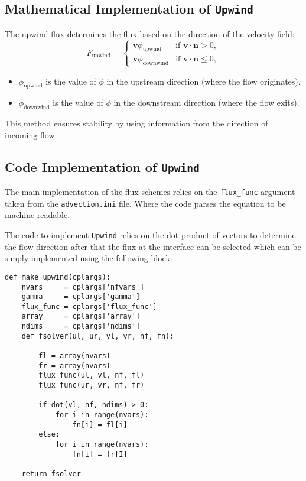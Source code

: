 \documentclass[a4paper, 12pt]{article}
\begin{document}
\subsection{Mathematical Implementation of \texttt{Upwind}}
The upwind flux determines the flux based on the direction of the velocity field:
\begin{equation}
F_{\text{upwind}} = 
\begin{cases} 
\mathbf{v} \phi_{\text{upwind}} & \text{if } \mathbf{v} \cdot \mathbf{n} > 0, \\
\mathbf{v} \phi_{\text{downwind}} & \text{if } \mathbf{v} \cdot \mathbf{n} \leq 0,
\end{cases}
\end{equation}
\begin{itemize}
    \item $\phi_{\text{upwind}}$ is the value of $\phi$ in the upstream direction (where the flow originates).
    \item $\phi_{\text{downwind}}$ is the value of $\phi$ in the downstream direction (where the flow exits).
\end{itemize} \par

This method ensures stability by using information from the direction of incoming flow.

\subsection{Code Implementation of \texttt{Upwind}}
The main implementation of the flux schemes relies on the \verb|flux_func| argument taken from the \verb|advection.ini| file. Where the code parses the equation to be machine-readable. \\\par
The code to implement \verb|Upwind| relies on the dot product of vectors to determine the flow direction after that the flux at the interface can be selected which can be simply implemented using the following block:

\begin{verbatim}
def make_upwind(cplargs):
    nvars     = cplargs['nfvars']
    gamma     = cplargs['gamma']
    flux_func = cplargs['flux_func']
    array     = cplargs['array']
    ndims     = cplargs['ndims']
    def fsolver(ul, ur, vl, vr, nf, fn):
    
        fl = array(nvars)
        fr = array(nvars)
        flux_func(ul, vl, nf, fl)
        flux_func(ur, vr, nf, fr)
        
        if dot(vl, nf, ndims) > 0:
            for i in range(nvars):
                fn[i] = fl[i]
        else:
            for i in range(nvars):
                fn[i] = fr[I]
                
    return fsolver
\end{verbatim}
\end{document}
